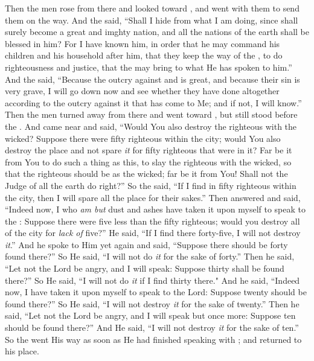 \bverse Then the men rose from there and looked toward , and  went with them to send them on the way.
\bverse And the \lord said, ``Shall I hide from  what I am doing,
\bverse since  shall surely become a great and imghty nation, and all the nations of the earth shall be blessed in him?
\bverse For I have known him, in order that he may command his children and his household after him, that they keep the way of the \lord, to do righteousness and justice, that the \lord may bring to  what He has spoken to him.''
\bverse And the \lord said, ``Because the outcry against  and  is great, and because their sin is very grave,
\bverse I will go down now and see whether they have done altogether according to the outcry against it that has come to Me; and if not, I will know.''
\bverse Then the men turned away from there and went toward , but  still stood before the \lord.
\bverse And  came near and said, ``Would You also destroy the righteous with the wicked?
\bverse Suppose there were fifty righteous within the city; would You also destroy the place and not spare \textit{it} for fifty righteous that were in it?
\bverse Far be it from You to do such a thing as this, to slay the righteous with the wicked, so that the righteous should be as the wicked; far be it from You! Shall not the Judge of all the earth do right?''
\bverse So the \lord said, ``If I find in  fifty righteous within the city, then I will spare all the place for their sakes.''
\bverse Then  answered and said, ``Indeed now, I who \textit{am but} dust and ashes have taken it upon myself to speak to the \lord:
\bverse Suppose there were five less than the fifty righteous; would you destroy all of the city for \textit{lack of} five?'' He said, ``If I find there forty-five, I will not destroy \textit{it}.''
\bverse And he spoke to Him yet again and said, ``Suppose there should be forty found there?'' So He said, ``I will not do \textit{it} for the sake of forty.''
\bverse Then he said, ``Let not the Lord be angry, and I will speak: Suppose thirty shall be found there?'' So He said, ``I will not do \textit{it} if I find thirty there."
\bverse And he said, ``Indeed now, I have taken it upon myself to speak to the Lord: Suppose twenty should be found there?'' So He said, ``I will not destroy \textit{it} for the sake of twenty.''
\bverse Then he said, ``Let not the Lord be angry, and I will speak but once more: Suppose ten should be found there?'' And He said, ``I will not destroy \textit{it} for the sake of ten.''
\bverse So the \lord went His way as soon as He had finished speaking with ; and  returned to his place.

